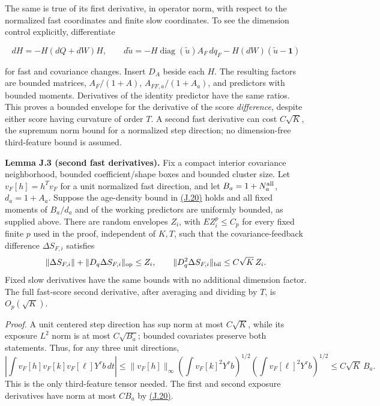 \documentclass[11pt]{article}
\begin{document}
The same is true of its first derivative, in operator norm, with respect to the normalized fast coordinates and finite slow coordinates. To see the dimension control explicitly, differentiate

\begin{equation*}
dH=-H(dQ+dW)H,\qquad
 d\widetilde u=-H\operatorname{diag}(\widetilde u)A_F\,dq_F
                -H(dW)(\widetilde u-\mathbf1)
\tag{J.22}\label{eq:J.22}
\end{equation*}

for fast and covariance changes. Insert \(D_A\) beside each \(H\). The resulting factors are bounded matrices, \(A_F/(1+A)\), \(A_{FF,a}/(1+A_a)\), and predictors with bounded moments. Derivatives of the identity predictor have the same ratios. This proves a bounded envelope for the derivative of the score \emph{difference}, despite either score having curvature of order \(T\). A second fast derivative can cost \(C\sqrt K\), the supremum norm bound for a normalized step direction; no dimension-free third-feature bound is assumed.

\label{res:Lemma-J.3}
\textbf{Lemma J.3 (second fast derivatives).} Fix a compact interior covariance neighborhood, bounded coefficient/shape boxes and bounded cluster size. Let \(v_F[h]=h^Tv_F\) for a unit normalized fast direction, and let \(B_a=1+N_a^{\rm all}\), \(d_a=1+A_a\). Suppose the age-density bound in \hyperref[eq:J.20]{(J.20)} holds and all fixed moments of \(B_a/d_a\) and of the working predictors are uniformly bounded, as supplied above. There are random envelopes \(Z_i\), with \(E Z_i^p\le C_p\) for every fixed finite \(p\) used in the proof, independent of \(K,T\), such that the covariance-feedback difference \(\Delta S_{F,i}\) satisfies
\begin{equation*}
\|\Delta S_{F,i}\|+\|D_q\Delta S_{F,i}\|_{\rm op}\le Z_i,\qquad
\|D_q^2\Delta S_{F,i}\|_{\rm bil}\le C\sqrt K\,Z_i .
\end{equation*}
Fixed slow derivatives have the same bounds with no additional dimension factor. The full fast-score second derivative, after averaging and dividing by \(T\), is \(O_p(\sqrt K)\).

\emph{Proof.} A unit centered step direction has sup norm at most \(C\sqrt K\), while its exposure \(L^2\) norm is at most \(C\sqrt{B_a}\); bounded covariates preserve both statements. Thus, for any three unit directions,
\begin{equation*}
\left|\int v_F[h]v_F[k]v_F[\ell]Y^\tau b\,dt\right|
 \le \|v_F[h]\|_\infty
 \left(\int v_F[k]^2Y^\tau b\right)^{1/2}
 \left(\int v_F[\ell]^2Y^\tau b\right)^{1/2}
 \le C\sqrt K\,B_a .
\end{equation*}
This is the only third-feature tensor needed. The first and second exposure derivatives have norm at most \(CB_a\) by \hyperref[eq:J.20]{(J.20)}.
\end{document}
